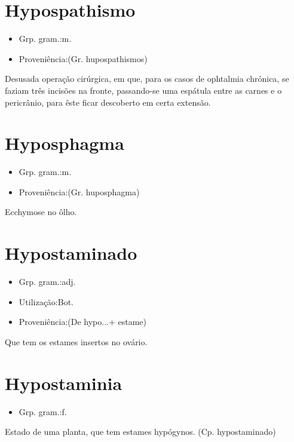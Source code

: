 \documentclass{article}
\begin{document}
\section{Hypospathismo}
\begin{itemize}
\item {Grp. gram.:m.}
\end{itemize}
\begin{itemize}
\item {Proveniência:(Gr. \textunderscore hupospathismos\textunderscore )}
\end{itemize}
Desusada operação cirúrgica, em que, para os casos de ophtalmia chrónica, se faziam três incisões na fronte, passando-se uma espátula entre as carnes e o pericrânio, para êste ficar descoberto em certa extensão.
\section{Hyposphagma}
\begin{itemize}
\item {Grp. gram.:m.}
\end{itemize}
\begin{itemize}
\item {Proveniência:(Gr. \textunderscore huposphagma\textunderscore )}
\end{itemize}
Ecchymose no ôlho.
\section{Hypostaminado}
\begin{itemize}
\item {Grp. gram.:adj.}
\end{itemize}
\begin{itemize}
\item {Utilização:Bot.}
\end{itemize}
\begin{itemize}
\item {Proveniência:(De \textunderscore hypo...\textunderscore  + \textunderscore estame\textunderscore )}
\end{itemize}
Que tem os estames insertos no ovário.
\section{Hypostaminia}
\begin{itemize}
\item {Grp. gram.:f.}
\end{itemize}
Estado de uma planta, que tem estames hypógynos.
(Cp. \textunderscore hypostaminado\textunderscore )
\end{document}
